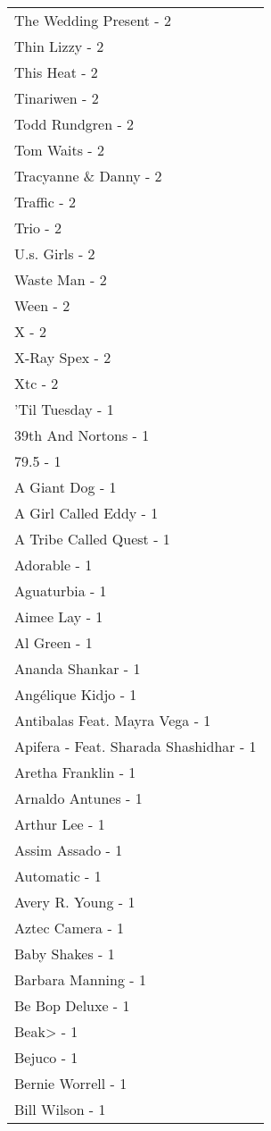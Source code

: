 \documentclass[
]{article}
\begin{document}
\begin{longtable}{l}
The Wedding Present - 2 \\ 
Thin Lizzy - 2 \\ 
This Heat - 2 \\ 
Tinariwen - 2 \\ 
Todd Rundgren - 2 \\ 
Tom Waits - 2 \\ 
Tracyanne \& Danny - 2 \\ 
Traffic - 2 \\ 
Trio - 2 \\ 
U.s. Girls - 2 \\ 
Waste Man - 2 \\ 
Ween - 2 \\ 
X - 2 \\ 
X-Ray Spex - 2 \\ 
Xtc - 2 \\ 
'Til Tuesday - 1 \\ 
39th And Nortons - 1 \\ 
79.5 - 1 \\ 
A Giant Dog - 1 \\ 
A Girl Called Eddy - 1 \\ 
A Tribe Called Quest - 1 \\ 
Adorable - 1 \\ 
Aguaturbia - 1 \\ 
Aimee Lay - 1 \\ 
Al Green - 1 \\ 
Ananda Shankar - 1 \\ 
Angélique Kidjo - 1 \\ 
Antibalas Feat. Mayra Vega - 1 \\ 
Apifera - Feat. Sharada Shashidhar - 1 \\ 
Aretha Franklin - 1 \\ 
Arnaldo Antunes - 1 \\ 
Arthur Lee - 1 \\ 
Assim Assado - 1 \\ 
Automatic - 1 \\ 
Avery R. Young - 1 \\ 
Aztec Camera - 1 \\ 
Baby Shakes - 1 \\ 
Barbara Manning - 1 \\ 
Be Bop Deluxe - 1 \\ 
Beak> - 1 \\ 
Bejuco - 1 \\ 
Bernie Worrell - 1 \\ 
Bill Wilson - 1 \\ 

\end{longtable}
\end{document}
